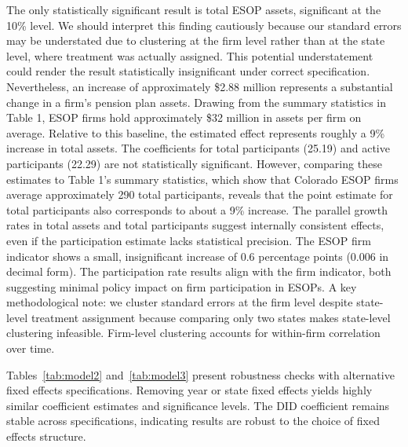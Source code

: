 \documentclass[12pt]{article}
\begin{document}
The only statistically significant result is total ESOP assets, significant at the 10\% level. We should interpret this finding cautiously because our standard errors may be understated due to clustering at the firm level rather than at the state level, where treatment was actually assigned. This potential understatement could render the result statistically insignificant under correct specification. Nevertheless, an increase of approximately \$2.88 million represents a substantial change in a firm's pension plan assets. Drawing from the summary statistics in Table 1, ESOP firms hold approximately \$32 million in assets per firm on average. Relative to this baseline, the estimated effect represents roughly a 9\% increase in total assets.
The coefficients for total participants (25.19) and active participants (22.29) are not statistically significant. However, comparing these estimates to Table 1's summary statistics, which show that Colorado ESOP firms average approximately 290 total participants, reveals that the point estimate for total participants also corresponds to about a 9\% increase. The parallel growth rates in total assets and total participants suggest internally consistent effects, even if the participation estimate lacks statistical precision. The ESOP firm indicator shows a small, insignificant increase of 0.6 percentage points (0.006 in decimal form). The participation rate results align with the firm indicator, both suggesting minimal policy impact on firm participation in ESOPs.
A key methodological note: we cluster standard errors at the firm level despite state-level treatment assignment because comparing only two states makes state-level clustering infeasible. Firm-level clustering accounts for within-firm correlation over time.

Tables~\ref{tab:model2} and~\ref{tab:model3} present robustness checks with alternative fixed effects specifications. Removing year or state fixed effects yields highly similar coefficient estimates and significance levels. The DID coefficient remains stable across specifications, indicating results are robust to the choice of fixed effects structure.
\end{document}

